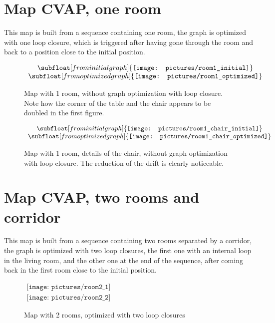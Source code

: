 \cleardoublepage
\section{Map CVAP, one room}

This map is built from a sequence containing one room, the graph is optimized with one loop closure, which is triggered after having gone through the room and back to a position close to the initial position. 

\begin{figure}[H]
\centering$
\begin{array}{c}
\subfloat[from initial graph]{\label{fig:room1_1}\texttt{[image: pictures/room1\_initial]}} \\
\subfloat[from optimized graph]{\label{fig:room1_2}\texttt{[image: pictures/room1\_optimized]}}
 \end{array}$
\caption{Map with 1 room,  \protect{} without graph optimization \protect{} with loop closure. Note how the corner of the table and the chair appears to be doubled in the first figure.}
\end{figure}

\begin{figure}[H]
\centering$
\begin{array}{c}
\subfloat[from initial graph]{\label{fig:room1_chair_1}\texttt{[image: pictures/room1\_chair\_initial]}} \\
\subfloat[from optimized graph]{\label{fig:room1_chair_2}\texttt{[image: pictures/room1\_chair\_optimized]}}
\end{array}$
\caption{Map with 1 room, details of the chair, \protect{} without graph optimization \protect{} with loop closure. The reduction of the drift is clearly noticeable.}
\end{figure}

\clearpage
\section{Map CVAP, two rooms and corridor}

This map is built from a sequence containing two rooms separated by a corridor, the graph is optimized with two loop closures, the first one with an internal loop in the living room, and the other one at the end of the sequence, after coming back in the first room close to the initial position. 

\begin{figure}[H]
\centering$
 \begin{array}{c}
 \texttt{[image: pictures/room2\_1]}\\
 \texttt{[image: pictures/room2\_2]}
 \end{array}$
\caption{Map with 2 rooms, optimized with two loop closures}
\end{figure}

